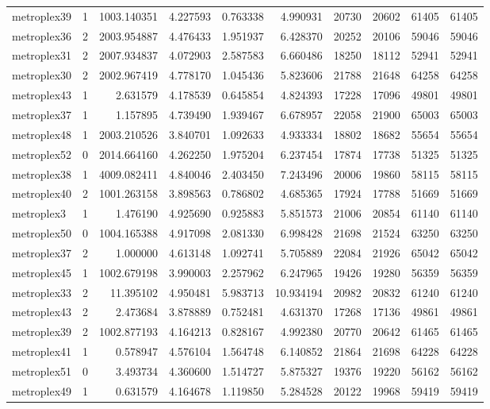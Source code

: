 \begin{longtable}{|l|r|r|r|r|r|r|r|r|r|}
metroplex39 & 1 & 1003.140351 & 4.227593 & 0.763338 & 4.990931 & 20730 & 20602 & 61405 & 61405 \\
metroplex36 & 2 & 2003.954887 & 4.476433 & 1.951937 & 6.428370 & 20252 & 20106 & 59046 & 59046 \\
metroplex31 & 2 & 2007.934837 & 4.072903 & 2.587583 & 6.660486 & 18250 & 18112 & 52941 & 52941 \\
metroplex30 & 2 & 2002.967419 & 4.778170 & 1.045436 & 5.823606 & 21788 & 21648 & 64258 & 64258 \\
metroplex43 & 1 & 2.631579 & 4.178539 & 0.645854 & 4.824393 & 17228 & 17096 & 49801 & 49801 \\
metroplex37 & 1 & 1.157895 & 4.739490 & 1.939467 & 6.678957 & 22058 & 21900 & 65003 & 65003 \\
metroplex48 & 1 & 2003.210526 & 3.840701 & 1.092633 & 4.933334 & 18802 & 18682 & 55654 & 55654 \\
metroplex52 & 0 & 2014.664160 & 4.262250 & 1.975204 & 6.237454 & 17874 & 17738 & 51325 & 51325 \\
metroplex38 & 1 & 4009.082411 & 4.840046 & 2.403450 & 7.243496 & 20006 & 19860 & 58115 & 58115 \\
metroplex40 & 2 & 1001.263158 & 3.898563 & 0.786802 & 4.685365 & 17924 & 17788 & 51669 & 51669 \\
metroplex3 & 1 & 1.476190 & 4.925690 & 0.925883 & 5.851573 & 21006 & 20854 & 61140 & 61140 \\
metroplex50 & 0 & 1004.165388 & 4.917098 & 2.081330 & 6.998428 & 21698 & 21524 & 63250 & 63250 \\
metroplex37 & 2 & 1.000000 & 4.613148 & 1.092741 & 5.705889 & 22084 & 21926 & 65042 & 65042 \\
metroplex45 & 1 & 1002.679198 & 3.990003 & 2.257962 & 6.247965 & 19426 & 19280 & 56359 & 56359 \\
metroplex33 & 2 & 11.395102 & 4.950481 & 5.983713 & 10.934194 & 20982 & 20832 & 61240 & 61240 \\
metroplex43 & 2 & 2.473684 & 3.878889 & 0.752481 & 4.631370 & 17268 & 17136 & 49861 & 49861 \\
metroplex39 & 2 & 1002.877193 & 4.164213 & 0.828167 & 4.992380 & 20770 & 20642 & 61465 & 61465 \\
metroplex41 & 1 & 0.578947 & 4.576104 & 1.564748 & 6.140852 & 21864 & 21698 & 64228 & 64228 \\
metroplex51 & 0 & 3.493734 & 4.360600 & 1.514727 & 5.875327 & 19376 & 19220 & 56162 & 56162 \\
metroplex49 & 1 & 0.631579 & 4.164678 & 1.119850 & 5.284528 & 20122 & 19968 & 59419 & 59419 \\

\end{longtable}
